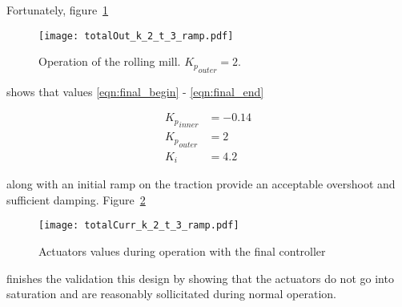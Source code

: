 Fortunately, figure~\ref{fig:totalOut_k_2_t_3}
\begin{figure}[htbp]
  \centering
  \texttt{[image: totalOut\_k\_2\_t\_3\_ramp.pdf]}
  \caption{Operation of the rolling mill. ${K_p}_{outer} = 2$.\label{fig:totalOut_k_2_t_3}}
\end{figure}
shows that values \ref{eqn:final_begin} - \ref{eqn:final_end}
\begin{figure*}[htb]
\begin{align}
  {K_p}_{inner} &= -0.14\label{eqn:final_begin}\\
  {K_p}_{outer} &= 2\\
  K_i &= 4.2\label{eqn:final_end}
\end{align}
\end{figure*}
along with an initial ramp on the traction provide an acceptable overshoot and sufficient damping. Figure~\ref{fig:totalCurr_k_2_t_3_ramp}
\begin{figure}[htbp]
  \centering
  \texttt{[image: totalCurr\_k\_2\_t\_3\_ramp.pdf]}
  \caption{Actuators values during operation with the final controller\label{fig:totalCurr_k_2_t_3_ramp}}
\end{figure}
finishes the validation this design by showing that the actuators do not go into saturation and are reasonably sollicitated during normal operation.
